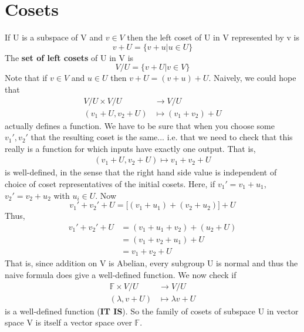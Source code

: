 \documentclass[a4paper, 11pt]{article}
\newcommand{\F}{\mathbb{F}}
\begin{document}
\section*{Cosets}
	If U is a subspace of V and $v\in V$ then the left coset of U in V represented by v is
		\begin{equation}
			v+U = \{v+u|u\in U\}
		\end{equation}
	The \textbf{set of left cosets} of U in V is 
		\begin{equation}
			V/U = \{v+U | v \in V\}
		\end{equation}
	Note that if $v\in V$ and $u \in U$ then $v+U = (v+u)+U$. Naively, we could hope that 
		\begin{align*}
			V/U \times V/U &\to V/U  \\ 
			(v_1+U, v_2+U) &\mapsto (v_1+v_2)+U
		\end{align*}
	actually defines a function. We have to be sure that when you choose some $v_1', v_2'$ that the resulting coset is the same... i.e. that we need to check that this really is a function for which inputs have exactly one output. That is, 
		\begin{align*}
			(v_1+U, v_2+U) \mapsto v_1+v_2+U
		\end{align*}
	is well-defined, in the sense that the right hand side value is independent of choice of coset representatives of the initial cosets. Here, if $v_1' = v_1+u_1$, $v_2' = v_2+u_2$ with $u_i \in U$. Now 
		\begin{equation*}
			v_1' + v_2' + U = \Big[(v_1+u_1)+(v_2+u_2)\Big]+ U
		\end{equation*}
	Thus,
		\begin{align*}
			v_1'+v_2'+U &= (v_1+u_1+v_2) + (u_2 + U) \\ 
				&= (v_1+v_2+u_1) + U \\ 
				&= v_1+v_2 + U
		\end{align*}
	That is, since addition on V is Abelian, every subgroup U is normal and thus the naive formula does give a well-defined function. We now check if 
		\begin{align*}
			\F \times V/U &\to V/U \\ 
			(\lambda, v+U)&\mapsto \lambda v + U
		\end{align*}
	is a well-defined function (\textbf{IT IS}). So the family of cosets of subspace U in vector space V is itself a vector space over $\F$. 
	
\end{document}
